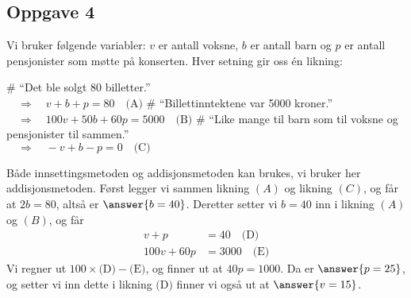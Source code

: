\subsection*{Oppgave 4}
Vi bruker følgende variabler: $v$ er antall voksne, $b$ er antall barn og $p$ er antall pensjonister som møtte på konserten.
Hver setning gir oss én likning:
\begin{easylist}[itemize]
	# ``Det ble solgt 80 billetter.'' \\$\quad \Rightarrow \quad v + b + p = 80 \quad \text{(A)}$
	# ``Billettinntektene var 5000 kroner.'' \\ 
	$\quad \Rightarrow \quad 100v + 50b + 60p = 5000 \quad \text{(B)}$
	# ``Like mange til barn som til voksne og pensjonister til sammen.'' \\ $\quad \Rightarrow \quad - v + b - p = 0 \quad \text{(C)}$
\end{easylist}
Både innsettingsmetoden og addisjonsmetoden kan brukes, vi bruker her addisjonsmetoden.
Først legger vi sammen likning $(A)$ og likning $(C)$, og får at $2b = 80$,
altså er $\answer{b=40}$.
Deretter setter vi $b = 40$ inn i likning $(A)$ og $(B)$, og får
\begin{align*}
	v + p &= 40 \quad \text{(D)}\\
	100v  + 60p &= 3000\quad \text{(E)}
\end{align*}
Vi regner ut $100 \times \text{(D)} - \text{(E)}$, og finner ut at $40p = 1000$.
Da er $\answer{p = 25}$, og setter vi inn dette i likning $\text{(D)}$ finner vi også ut at $\answer{v = 15}$.



